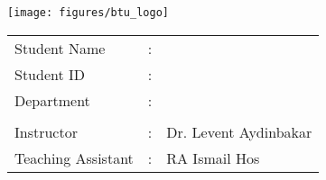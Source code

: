 \documentclass[addpoints]{exam}
\begin{document}
\begin{center}
\texttt{[image: figures/btu\_logo]}%

\end{center}
\begin{minipage}[c]{0.45\linewidth}
\begin{flushleft}
\begin{tabular}{l l l }
Student Name	&:   & \hspace{1cm} \\
Student ID		&:   & \hspace{1cm} \\
Department		&:   & \hspace{1cm} \\
  				& 	 & \hspace{1cm} \\
Instructor		&:   & Dr. Levent Aydinbakar\\
Teaching Assistant		&:   & RA Ismail Hos\\
\end{tabular}
\end{flushleft}

\end{minipage}
\begin{minipage}[c]{0.6\linewidth}
\begin{flushleft}
\gradetable[h]
\end{flushleft}
\end{minipage}
\end{document}
